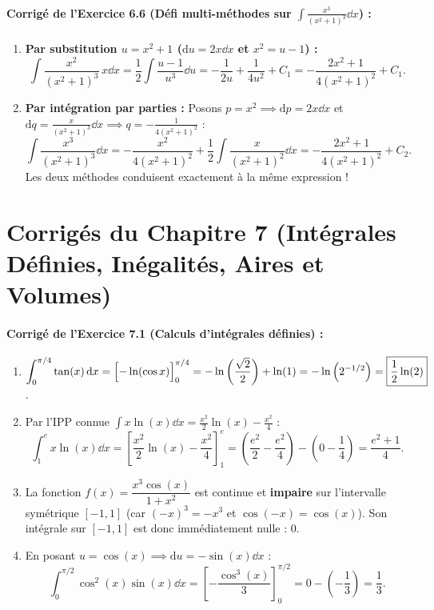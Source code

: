 \paragraph{Corrigé de l'Exercice 6.6 (Défi multi-méthodes sur $\int \frac{x^3}{(x^2+1)^3}\dd x$) :}
\begin{enumerate}[label=(\alph*)]
    \item \textbf{Par substitution $u = x^2 + 1$ ($\mathrm{d}u = 2x\dd x$ et $x^2 = u - 1$) :}
    \[
        \int \frac{x^2}{(x^2+1)^3}\,x\dd x = \frac{1}{2}\int \frac{u - 1}{u^3}\dd u = -\frac{1}{2u} + \frac{1}{4u^2} + C_1 = \boxed{-\frac{2x^2 + 1}{4(x^2 + 1)^2} + C_1}.
    \]
    \item \textbf{Par intégration par parties :} Posons $p = x^2 \implies \mathrm{d}p = 2x\dd x$ et $\mathrm{d}q = \frac{x}{(x^2+1)^3}\dd x \implies q = -\frac{1}{4(x^2+1)^2}$ :
    \[
        \int \frac{x^3}{(x^2+1)^3}\dd x = -\frac{x^2}{4(x^2+1)^2} + \frac{1}{2}\int \frac{x}{(x^2+1)^2}\dd x = \boxed{-\frac{2x^2 + 1}{4(x^2 + 1)^2} + C_2}.
    \]
    Les deux méthodes conduisent exactement à la même expression !
\end{enumerate}

\section{Corrigés du Chapitre 7 (Intégrales Définies, Inégalités, Aires et Volumes)}

\paragraph{Corrigé de l'Exercice 7.1 (Calculs d'intégrales définies) :}
\begin{enumerate}[label=(\alph*)]
    \item $\displaystyle\int_0^{\pi/4} \tan(x)\,\mathrm{d} x = \Bigl[-\ln(\cos x)\Bigr]_0^{\pi/4} = -\ln\left(\frac{\sqrt{2}}{2}\right) + \ln(1) = -\ln\left(2^{-1/2}\right) = \boxed{\frac{1}{2}\ln(2)}$.
    \item Par l'IPP connue $\int x\ln(x)\dd x = \frac{x^2}{2}\ln(x) - \frac{x^2}{4}$ :
    \[
        \int_1^e x\ln(x)\dd x = \left[\frac{x^2}{2}\ln(x) - \frac{x^2}{4}\right]_1^e = \left(\frac{e^2}{2} - \frac{e^2}{4}\right) - \left(0 - \frac{1}{4}\right) = \boxed{\frac{e^2 + 1}{4}}.
    \]
    \item La fonction $f(x) = \dfrac{x^3\cos(x)}{1+x^2}$ est continue et \textbf{impaire} sur l'intervalle symétrique $[-1, 1]$ (car $(-x)^3 = -x^3$ et $\cos(-x) = \cos(x)$). Son intégrale sur $[-1, 1]$ est donc immédiatement nulle : $\boxed{0}$.
    \item En posant $u = \cos(x) \implies \mathrm{d}u = -\sin(x)\dd x$ :
    \[
        \int_0^{\pi/2} \cos^2(x)\sin(x)\dd x = \left[-\frac{\cos^3(x)}{3}\right]_0^{\pi/2} = 0 - \left(-\frac{1}{3}\right) = \boxed{\frac{1}{3}}.
    \]
\end{enumerate}

